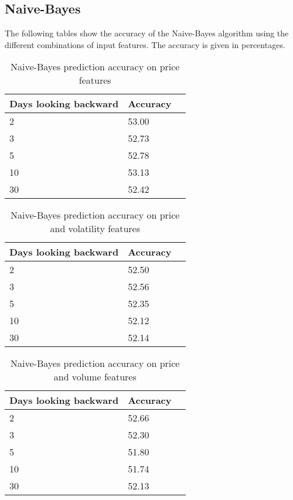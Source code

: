 \documentclass{article}
\begin{document}
\subsection{Naive-Bayes}
The following tables show the accuracy of the Naive-Bayes algorithm using the different combinations of input features. The accuracy is given in percentages.
\\
\begin{table}[!h]
\begin{center}
    \begin{tabular}{ | l | l | p{3cm} |}
    \hline
    Days looking backward & Accuracy \\ \hline
    2 & 53.00  \\ \hline
    3 & 52.73  \\ \hline
    5 & 52.78  \\ \hline
    10 & 53.13  \\ \hline
    30 & 52.42 \\ 
    \hline
    \end{tabular}
\caption{Naive-Bayes prediction accuracy on price features}
\end{center}
\end{table}

\begin{table}[!h]
\begin{center}
    \begin{tabular}{ | l | l | p{3cm} |}
    \hline
    Days looking backward & Accuracy \\ \hline
    2 & 52.50  \\ \hline
    3 & 52.56  \\ \hline
    5 & 52.35  \\ \hline
    10 & 52.12  \\ \hline
    30 & 52.14 \\ 
    \hline
    \end{tabular}
\caption{Naive-Bayes prediction accuracy on price and volatility features}
\end{center}
\end{table}

\begin{table}[!h]
\begin{center}
    \begin{tabular}{ | l | l | p{3cm} |}
    \hline
    Days looking backward & Accuracy \\ \hline
    2 & 52.66  \\ \hline
    3 & 52.30  \\ \hline
    5 & 51.80  \\ \hline
    10 & 51.74  \\ \hline
    30 & 52.13 \\ 
    \hline
    \end{tabular}
\caption{Naive-Bayes prediction accuracy on price and volume features}
\end{center}
\end{table}
\end{document}
